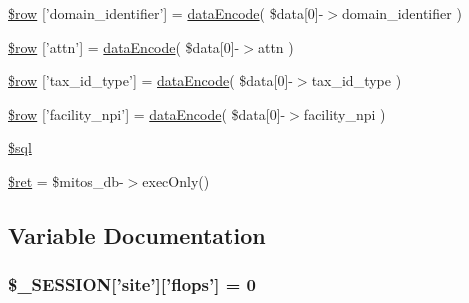 \begin{DoxyCompactItemize}
\item 
\hyperlink{patientfile_2immnunization_2data__create_8ejs_8php_a1c503dc6be7e45d4cce60426e0dc6c16}{\$row} \mbox{[}'domain\-\_\-identifier'\mbox{]} = \hyperlink{data_exchange_8class_8php_a18220e6e744fcb46d788ed8b03b85f62}{data\-Encode}( \$data\mbox{[}0\mbox{]}-\/$>$domain\-\_\-identifier )
\item 
\hyperlink{patientfile_2immnunization_2data__create_8ejs_8php_af8886f39ae82fe4c6411bad1e0097c79}{\$row} \mbox{[}'attn'\mbox{]} = \hyperlink{data_exchange_8class_8php_a18220e6e744fcb46d788ed8b03b85f62}{data\-Encode}( \$data\mbox{[}0\mbox{]}-\/$>$attn )
\item 
\hyperlink{patientfile_2immnunization_2data__create_8ejs_8php_ad7a9a2a4679ba8036c5c2fa97dee89c4}{\$row} \mbox{[}'tax\-\_\-id\-\_\-type'\mbox{]} = \hyperlink{data_exchange_8class_8php_a18220e6e744fcb46d788ed8b03b85f62}{data\-Encode}( \$data\mbox{[}0\mbox{]}-\/$>$tax\-\_\-id\-\_\-type )
\item 
\hyperlink{patientfile_2immnunization_2data__create_8ejs_8php_abca371c5e770b60b9b3dacacf9877173}{\$row} \mbox{[}'facility\-\_\-npi'\mbox{]} = \hyperlink{data_exchange_8class_8php_a18220e6e744fcb46d788ed8b03b85f62}{data\-Encode}( \$data\mbox{[}0\mbox{]}-\/$>$facility\-\_\-npi )
\item 
\hyperlink{patientfile_2immnunization_2data__create_8ejs_8php_a047170d6020a882807665812a27e2525}{\$sql}
\item 
\hyperlink{patientfile_2immnunization_2data__create_8ejs_8php_affd9e3eb0aad0a7ca42912cd925f148c}{\$ret} = \$mitos\-\_\-db-\/$>$exec\-Only()
\end{DoxyCompactItemize}


\subsection{\-Variable \-Documentation}
\hypertarget{patientfile_2immnunization_2data__create_8ejs_8php_a99fda8552a3e58235643b79f5af3ded8}{
\subsubsection[{\$\-\_\-\-S\-E\-S\-S\-I\-O\-N}]{\setlength{\rightskip}{0pt plus 5cm}\$\-\_\-\-S\-E\-S\-S\-I\-O\-N\mbox{[}'site'\mbox{]}\mbox{[}'flops'\mbox{]} = 0}}\label{patientfile_2immnunization_2data__create_8ejs_8php_a99fda8552a3e58235643b79f5af3ded8}


